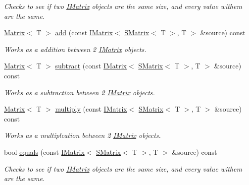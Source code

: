 \begin{DoxyCompactItemize}
\begin{DoxyCompactList}\small\item\em Checks to see if two \mbox{\hyperlink{class_i_matrix}{I\+Matrix}} objects are the same size, and every value withem are the same. \end{DoxyCompactList}\item 
\mbox{\hyperlink{class_matrix}{Matrix}}$<$ T $>$ \mbox{\hyperlink{class_d_matrix_a93d315343751e59b20c5ee07b23f35c9}{add}} (const \mbox{\hyperlink{class_i_matrix}{I\+Matrix}}$<$ \mbox{\hyperlink{class_s_matrix}{S\+Matrix}}$<$ T $>$, T $>$ \&source) const
\begin{DoxyCompactList}\small\item\em Works as a addition between 2 \mbox{\hyperlink{class_i_matrix}{I\+Matrix}} objects. \end{DoxyCompactList}\item 
\mbox{\hyperlink{class_matrix}{Matrix}}$<$ T $>$ \mbox{\hyperlink{class_d_matrix_adb9cbdf78c3bf9d77e39cda4f4e04a08}{subtract}} (const \mbox{\hyperlink{class_i_matrix}{I\+Matrix}}$<$ \mbox{\hyperlink{class_s_matrix}{S\+Matrix}}$<$ T $>$, T $>$ \&source) const
\begin{DoxyCompactList}\small\item\em Works as a subtraction between 2 \mbox{\hyperlink{class_i_matrix}{I\+Matrix}} objects. \end{DoxyCompactList}\item 
\mbox{\hyperlink{class_matrix}{Matrix}}$<$ T $>$ \mbox{\hyperlink{class_d_matrix_afe62da0990506ed0f45d274b24f37a00}{multiply}} (const \mbox{\hyperlink{class_i_matrix}{I\+Matrix}}$<$ \mbox{\hyperlink{class_s_matrix}{S\+Matrix}}$<$ T $>$, T $>$ \&source) const
\begin{DoxyCompactList}\small\item\em Works as a multiplcation between 2 \mbox{\hyperlink{class_i_matrix}{I\+Matrix}} objects. \end{DoxyCompactList}\item 
bool \mbox{\hyperlink{class_d_matrix_a42bc5a61e5206a8380de8784bac5dfeb}{equals}} (const \mbox{\hyperlink{class_i_matrix}{I\+Matrix}}$<$ \mbox{\hyperlink{class_s_matrix}{S\+Matrix}}$<$ T $>$, T $>$ \&source) const
\begin{DoxyCompactList}\small\item\em Checks to see if two \mbox{\hyperlink{class_i_matrix}{I\+Matrix}} objects are the same size, and every value withem are the same. \end{DoxyCompactList}\item 

\end{DoxyCompactItemize}

